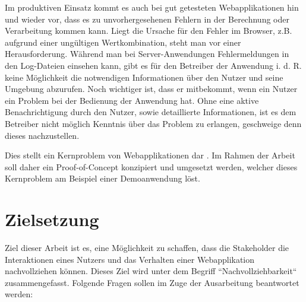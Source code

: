 Im produktiven Einsatz kommt es auch bei gut getesteten Webapplikationen hin und wieder vor, dass es zu unvorhergesehenen Fehlern in der Berechnung oder Verarbeitung kommen kann. Liegt die Ursache für den Fehler im Browser, z.B. aufgrund einer ungültigen Wertkombination, steht man vor einer Herausforderung. Während man bei Server-Anwendungen Fehlermeldungen in den Log-Dateien einsehen kann, gibt es für den Betreiber der Anwendung i. d. R. keine Möglichkeit die notwendigen Informationen über den Nutzer und seine Umgebung abzurufen. Noch wichtiger ist, dass er mitbekommt, wenn ein Nutzer ein Problem bei der Bedienung der Anwendung hat. Ohne eine aktive Benachrichtigung durch den Nutzer, sowie detaillierte Informationen, ist es dem Betreiber nicht möglich Kenntnis über das Problem zu erlangen, geschweige denn dieses nachzustellen.

Dies stellt ein Kernproblem von  Webapplikationen dar \cite{ClientSideMonitoringOfDistributedSystems}. Im Rahmen der Arbeit soll daher ein Proof-of-Concept konzipiert und umgesetzt werden, welcher dieses Kernproblem am Beispiel einer Demoanwendung löst.

\section{Zielsetzung}


Ziel dieser Arbeit ist es, eine Möglichkeit zu schaffen, dass die Stakeholder die Interaktionen eines Nutzers und das Verhalten einer Webapplikation nachvollziehen können. Dieses Ziel wird unter dem Begriff ``Nachvollziehbarkeit`` zusammengefasst. Folgende Fragen sollen im Zuge der Ausarbeitung beantwortet werden:


